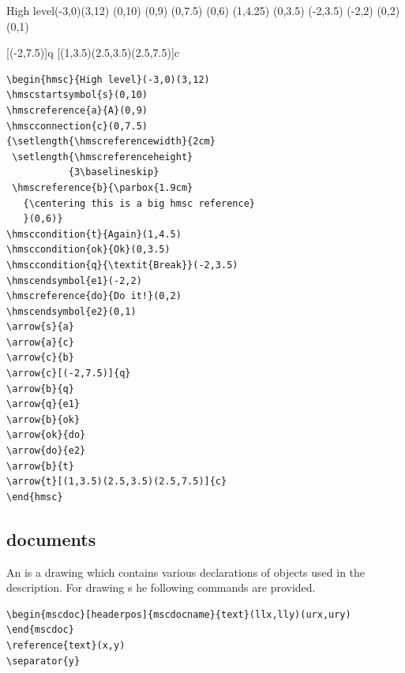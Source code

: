 \documentclass[12pt,a4paper]{article}
\begin{document}
\medskip

\noindent
\begin{minipage}[c]{0.375\linewidth}

\begin{hmsc}{High level}(-3,0)(3,12)
(0,10)
(0,9)
(0,7.5)
{
(0,6)
}
(1,4.25)
(0,3.5)
(-2,3.5)
(-2,2)
(0,2)
(0,1)

[(-2,7.5)]{q}
[(1,3.5)(2.5,3.5)(2.5,7.5)]{c}
\end{hmsc}
\end{minipage}\hfill
\begin{minipage}[c]{0.6\linewidth}
{\footnotesize
\begin{verbatim}
\begin{hmsc}{High level}(-3,0)(3,12)
\hmscstartsymbol{s}(0,10)
\hmscreference{a}{A}(0,9)
\hmscconnection{c}(0,7.5)
{\setlength{\hmscreferencewidth}{2cm}
 \setlength{\hmscreferenceheight}
           {3\baselineskip}
 \hmscreference{b}{\parbox{1.9cm}
   {\centering this is a big hmsc reference}
   }(0,6)}
\hmsccondition{t}{Again}(1,4.5)
\hmsccondition{ok}{Ok}(0,3.5)
\hmsccondition{q}{\textit{Break}}(-2,3.5)
\hmscendsymbol{e1}(-2,2)
\hmscreference{do}{Do it!}(0,2)
\hmscendsymbol{e2}(0,1)
\arrow{s}{a}
\arrow{a}{c}
\arrow{c}{b}
\arrow{c}[(-2,7.5)]{q}
\arrow{b}{q}
\arrow{q}{e1}
\arrow{b}{ok}
\arrow{ok}{do}
\arrow{do}{e2}
\arrow{b}{t}
\arrow{t}[(1,3.5)(2.5,3.5)(2.5,7.5)]{c}
\end{hmsc}
\end{verbatim}
}
\end{minipage}


\subsection{\MSC{} documents}
\label{mscdoc}
An \MSCdoc{} is a drawing which contains various declarations
of objects used in the \MSC{} description. For drawing \MSCdoc{}s
he following commands are provided.

\begin{verbatim}
\begin{mscdoc}[headerpos]{mscdocname}{text}(llx,lly)(urx,ury)
\end{mscdoc}
\reference{text}(x,y)
\separator{y}
\end{verbatim}
\end{document}
